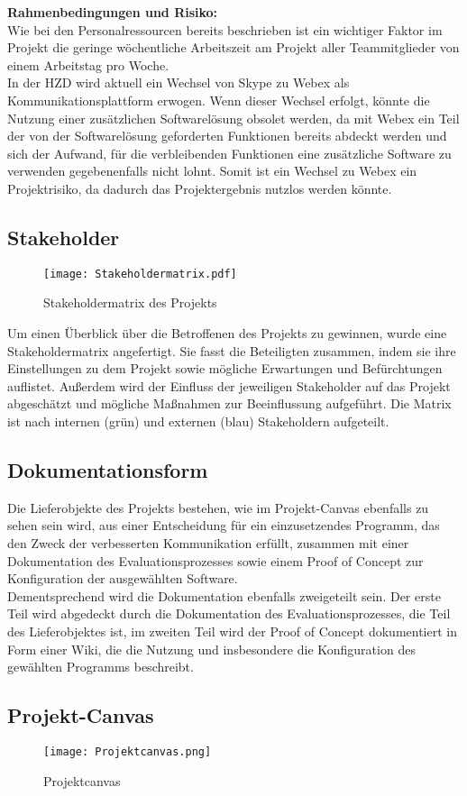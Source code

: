 \documentclass[ThesisDJ.tex]{subfiles}
\begin{document}
	\textbf{Rahmenbedingungen und Risiko:}\medskip\\
	Wie bei den Personalressourcen bereits beschrieben ist ein wichtiger Faktor im Projekt die geringe wöchentliche Arbeitszeit am Projekt aller Teammitglieder von einem Arbeitstag pro Woche.\\	
	In der HZD wird aktuell ein Wechsel von Skype zu Webex als Kommunikationsplattform erwogen. Wenn dieser Wechsel erfolgt, könnte die Nutzung einer zusätzlichen Softwarelösung obsolet werden, da mit Webex ein Teil der von der Softwarelösung geforderten Funktionen bereits abdeckt werden und sich der Aufwand, für die verbleibenden Funktionen eine zusätzliche Software zu verwenden gegebenenfalls nicht lohnt. Somit ist ein Wechsel zu Webex ein Projektrisiko, da dadurch das Projektergebnis nutzlos werden könnte. 
	\subsection{Stakeholder}
  \begin{figure}[h!]
    \texttt{[image: Stakeholdermatrix.pdf]}
    \centering
    \caption{Stakeholdermatrix des Projekts}
    \label{fig:stakeholders}
  \end{figure}

  Um einen Überblick über die Betroffenen des Projekts zu gewinnen, wurde eine Stakeholdermatrix angefertigt. Sie fasst die Beteiligten zusammen, indem sie ihre Einstellungen zu dem Projekt sowie mögliche Erwartungen und Befürchtungen auflistet. Außerdem wird der Einfluss der jeweiligen Stakeholder auf das Projekt abgeschätzt und mögliche Maßnahmen zur Beeinflussung aufgeführt. Die Matrix ist nach internen (grün) und externen (blau) Stakeholdern aufgeteilt. 

	
	\subsection{Dokumentationsform}
	
	Die Lieferobjekte des Projekts bestehen, wie im Projekt-Canvas ebenfalls zu sehen sein wird, aus einer Entscheidung für ein einzusetzendes Programm, das den Zweck der verbesserten Kommunikation erfüllt, zusammen mit einer Dokumentation des Evaluationsprozesses sowie einem Proof of Concept zur Konfiguration der ausgewählten Software.\\
	Dementsprechend wird die Dokumentation ebenfalls zweigeteilt sein. Der erste Teil wird abgedeckt durch die Dokumentation des Evaluationsprozesses, die Teil des Lieferobjektes ist, im zweiten Teil wird der Proof of Concept dokumentiert in Form einer Wiki, die die Nutzung und insbesondere die Konfiguration des gewählten Programms beschreibt. 
	
	\subsection{Projekt-Canvas}
  \begin{figure}
    \texttt{[image: Projektcanvas.png]}
    \centering
    \caption{Projektcanvas}
  \end{figure}
\end{document}

